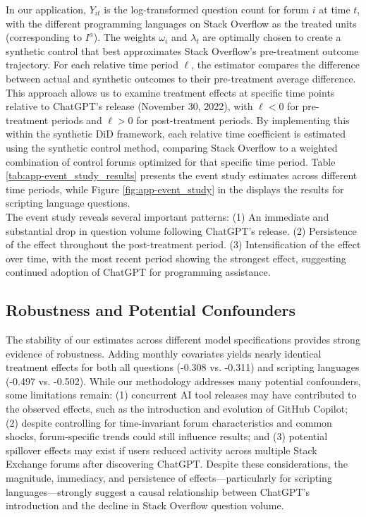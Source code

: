 In our application, $Y_{it}$ is the log-transformed question count for forum $i$ at time $t$, with the different programming languages on Stack Overflow as the treated units (corresponding to $I^a$). The weights $\omega_i$ and $\lambda_t$ are optimally chosen to create a synthetic control that best approximates Stack Overflow's pre-treatment outcome trajectory. For each relative time period $\ell$, the estimator compares the difference between actual and synthetic outcomes to their pre-treatment average difference.\\

This approach allows us to examine treatment effects at specific time points relative to ChatGPT's release (November 30, 2022), with $\ell < 0$ for pre-treatment periods and $\ell > 0$ for post-treatment periods. By implementing this within the synthetic DiD framework, each relative time coefficient is estimated using the synthetic control method, comparing Stack Overflow to a weighted combination of control forums optimized for that specific time period. Table \ref{tab:app-event_study_results} presents the event study estimates across different time periods, while Figure \ref{fig:app-event_study} in the  displays the results for scripting language questions.\\

The event study reveals several important patterns: (1) An immediate and substantial drop in question volume following ChatGPT's release. (2) Persistence of the effect throughout the post-treatment period. (3) Intensification of the effect over time, with the most recent period showing the strongest effect, suggesting continued adoption of ChatGPT for programming assistance.


\subsection{Robustness and Potential Confounders}

The stability of our estimates across different model specifications provides strong evidence of robustness. Adding monthly covariates yields nearly identical treatment effects for both all questions (-0.308 vs. -0.311) and scripting languages (-0.497 vs. -0.502). While our methodology addresses many potential confounders, some limitations remain: (1) concurrent AI tool releases may have contributed to the observed effects, such as the introduction and evolution of GitHub Copilot; (2) despite controlling for time-invariant forum characteristics and common shocks, forum-specific trends could still influence results; and (3) potential spillover effects may exist if users reduced activity across multiple Stack Exchange forums after discovering ChatGPT. Despite these considerations, the magnitude, immediacy, and persistence of effects—particularly for scripting languages—strongly suggest a causal relationship between ChatGPT's introduction and the decline in Stack Overflow question volume.

